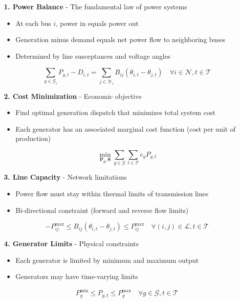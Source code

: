 \vspace{0.5cm}
\textbf{1. Power Balance} - The fundamental law of power systems
\begin{itemize}
    \item At each bus $i$, power in equals power out
    \item Generation minus demand equals net power flow to neighboring buses
    \item Determined by line susceptances and voltage angles
\end{itemize}
\begin{equation}
    \sum_{g \in \mathcal{G}_i} P_{g,t} - D_{i,t} = \sum_{j \in \mathcal{N}_i} B_{ij}(\theta_{i,t} - \theta_{j,t}) \quad \forall i \in \mathcal{N}, t \in \mathcal{T}
\end{equation}

\vspace{0.5cm}
\textbf{2. Cost Minimization} - Economic objective
\begin{itemize}
    \item Find optimal generation dispatch that minimizes total system cost
    \item Each generator has an associated marginal cost function (cost per unit of production)
\end{itemize}
\begin{equation}
    \min_{\mathbf{P_g}, \boldsymbol{\theta}} \sum_{g \in \mathcal{G}} \sum_{t \in \mathcal{T}} c_g P_{g,t}
\end{equation}

\vspace{0.5cm}
\textbf{3. Line Capacity} - Network limitations
\begin{itemize}
    \item Power flow must stay within thermal limits of transmission lines
    \item Bi-directional constraint (forward and reverse flow limits)
\end{itemize}
\begin{equation}
    -P_{ij}^{\max} \leq B_{ij}(\theta_{i,t} - \theta_{j,t}) \leq P_{ij}^{\max} \quad \forall (i,j) \in \mathcal{L}, t \in \mathcal{T}
\end{equation}

\vspace{0.5cm}
\textbf{4. Generator Limits} - Physical constraints
\begin{itemize}
    \item Each generator is limited by minimum and maximum output
    \item Generators may have time-varying limits
\end{itemize}
\begin{equation}
    P_{g}^{\min} \leq P_{g,t} \leq P_{g}^{\max} \quad \forall g \in \mathcal{G}, t \in \mathcal{T}
\end{equation}


